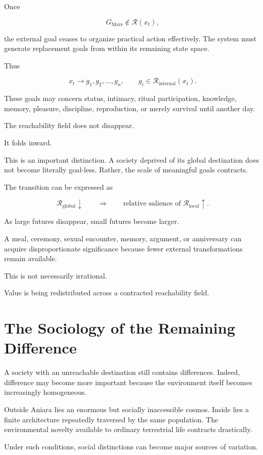 \documentclass[11pt,oneside]{book}
\theoremstyle{definition}
\theoremstyle{remark}
\newcommand{\R}{\mathcal{R}}
\begin{document}
Once

\[
G_{\mathrm{Mars}}\notin\R(x_t),
\]

the external goal ceases to organize practical action effectively. The system must generate replacement goals from within its remaining state space.

Thus

\[
x_t
\rightarrow
g_1,g_2,\ldots,g_n,
\qquad
g_i\in\R_{\mathrm{internal}}(x_t).
\]

These goals may concern status, intimacy, ritual participation, knowledge, memory, pleasure, discipline, reproduction, or merely survival until another day.

The reachability field does not disappear.

It folds inward.

This is an important distinction. A society deprived of its global destination does not become literally goal-less. Rather, the scale of meaningful goals contracts.

The transition can be expressed as

\[
\R_{\mathrm{global}}\downarrow
\qquad\Longrightarrow\qquad
\text{relative salience of }\R_{\mathrm{local}}\uparrow.
\]

As large futures disappear, small futures become larger.

A meal, ceremony, sexual encounter, memory, argument, or anniversary can acquire disproportionate significance because fewer external transformations remain available.

This is not necessarily irrational.

Value is being redistributed across a contracted reachability field.

\section{The Sociology of the Remaining Difference}

A society with an unreachable destination still contains differences. Indeed, difference may become more important because the environment itself becomes increasingly homogeneous.

Outside Aniara lies an enormous but socially inaccessible cosmos. Inside lies a finite architecture repeatedly traversed by the same population. The environmental novelty available to ordinary terrestrial life contracts drastically.

Under such conditions, social distinctions can become major sources of variation.
\end{document}
